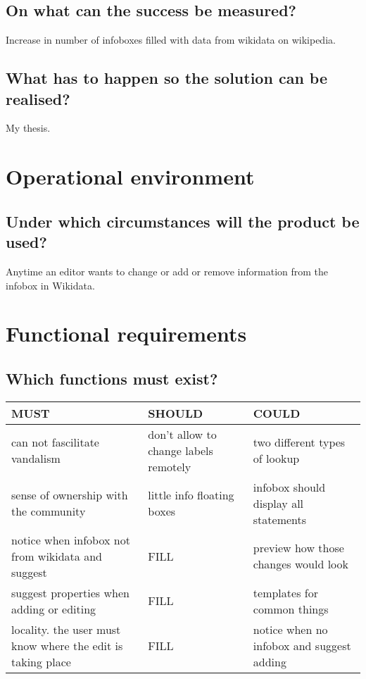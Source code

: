 \documentclass{article}
\begin{document}
\subsection{On what can the success be measured?}

Increase in number of infoboxes filled with data from wikidata on wikipedia.

\subsection{What has to happen so the solution can be realised?}

My thesis.

\section{Operational environment}

\subsection{Under which circumstances will the product be used?}

Anytime an editor wants to change or add or remove information from the infobox in Wikidata.

\newpage

\section{Functional requirements}

\subsection{Which functions must exist?}


\begin{tabular}{| >{\raggedright\arraybackslash}p{4cm} | >{\raggedright\arraybackslash}p{4cm} | >{\raggedright\arraybackslash}p{4cm} |}
\hline
MUST & SHOULD & COULD  \\ \hline
can not fascilitate vandalism & don't allow to change labels remotely & two different types of lookup \\ \hline
sense of ownership with the community & little info floating boxes & infobox should display all statements \\ \hline
notice when infobox not from wikidata and suggest & FILL & preview how those changes would look \\ \hline
suggest properties when adding or editing & FILL & templates for common things \\ \hline
locality. the user must know where the edit is taking place & FILL & notice when no infobox and suggest adding \\
\hline
\end{tabular}
\end{document}
